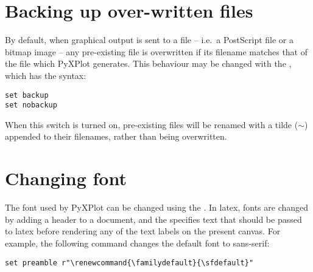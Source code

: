 \section{Backing up over-written files}
\label{sec:file_backup}

By default, when graphical output is sent to a file -- i.e.\ a PostScript file
or a bitmap image -- any pre-existing file is overwritten if its filename
matches that of the file which PyXPlot generates. This behaviour may be changed
with the , which has the syntax:

\begin{verbatim}
set backup
set nobackup
\end{verbatim}

When this switch is turned on, pre-existing files will be renamed with a tilde
($\sim$) appended to their filenames, rather than being overwritten.

\section{Changing font}

The font used by PyXPlot can be changed using the .  In
latex, fonts are changed by adding a header to a document, and the  specifies text that should be passed to latex before rendering any of
the text labels on the present canvas.  For example, the following command
changes the default font to sans-serif:

\begin{verbatim}
set preamble r"\renewcommand{\familydefault}{\sfdefault}"
\end{verbatim}

